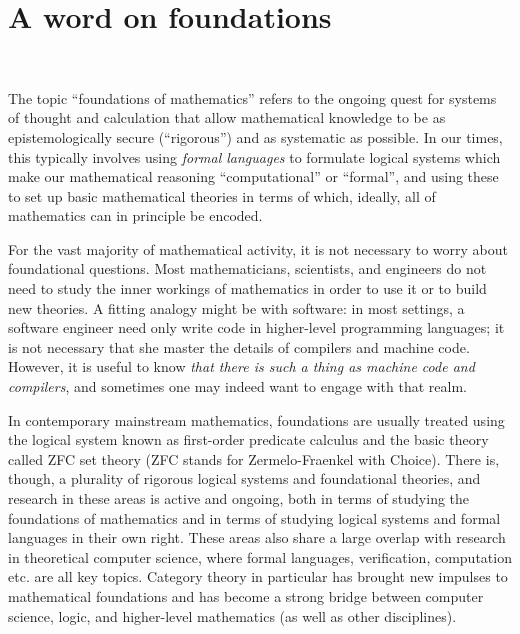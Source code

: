 

\section{A word on foundations}\label{sec:foundations}



\

The topic ``foundations of mathematics'' refers to the ongoing quest for systems of thought and calculation that allow mathematical knowledge to be as epistemologically secure (``rigorous'') and as systematic as possible. In our times, this typically involves using \emph{formal languages} to formulate logical systems which make our mathematical reasoning ``computational'' or ``formal'', and using these to set up basic mathematical theories in terms of which, ideally, all of mathematics can in principle be encoded.

For the vast majority of mathematical activity, it is not necessary to worry about foundational questions. Most mathematicians, scientists, and engineers do not need to study the inner workings of mathematics in order to use it or to build new theories. A fitting analogy might be with software: in most settings, a software engineer need only write code in higher-level programming languages; it is not necessary that she master the details of compilers and machine code. However, it is useful to know \emph{that there is such a thing as machine code and compilers}, and sometimes one may indeed want to engage with that realm.

In contemporary mainstream mathematics, foundations are usually treated using the logical system known as first-order predicate calculus and the basic theory called ZFC set theory (ZFC stands for Zermelo-Fraenkel with Choice). There is, though, a plurality of rigorous logical systems and foundational theories, and research in these areas is active and ongoing, both in terms of studying the foundations of mathematics and in terms of studying logical systems and formal languages in their own right. These areas also share a large overlap with research in theoretical computer science, where formal languages, verification, computation etc. are all key topics. Category theory in particular has brought new impulses to mathematical foundations and has become a strong bridge between computer science, logic, and higher-level mathematics (as well as other disciplines).


